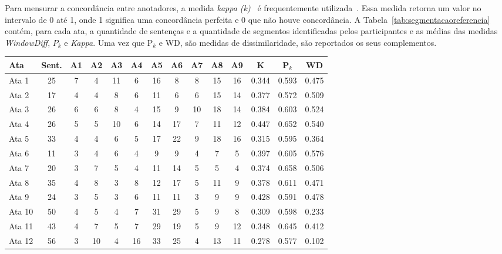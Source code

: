 Para mensurar a concordância entre anotadores, a medida \textit{kappa (k)}~\cite{Carletta1996} é frequentemente utilizada~\cite{Gruenstein2007, Cardoso2017, Hearst1997}.  Essa medida retorna um valor no intervalo de 0 até 1, onde 1 significa uma concordância perfeita e 0 que não houve concordância. A Tabela~\ref{tab:segmentacaoreferencia} contém, para cada ata, a quantidade de sentenças e a quantidade de segmentos identificadas pelos participantes e as médias das medidas \textit{WindowDiff}, $P_k$ e \textit{Kappa}. Uma vez que P$_k$ e WD, são medidas de dissimilaridade, são reportados os seus complementos.

\begin{table}[!h]
	\centering
	\begin{tabular}{|l|c|c|c|c|c|c|c|c|c|c|c|c|c|} \hline
		\textbf{Ata} & \textbf{Sent.}  & 
		\textbf{A1}  & 
		\textbf{A2}  & 
		\textbf{A3}  & 
		\textbf{A4}  & 
		\textbf{A5}  & 
		\textbf{A6}  & 
		\textbf{A7}  & 
		\textbf{A8}  & 
		\textbf{A9}  &
		\textbf{K}  &
		\textbf{P$_k$}  &
		\textbf{WD}  \\	\hline

		Ata 1  & 25 & 7  & 4  & 11 & 6  & 16 & 8  & 8  & 15 & 16 &  0.344 & 0.593 & 0.475 \\ \hline 
		Ata 2  & 17 & 4  & 4  & 8  & 6  & 11 & 6  & 6  & 15 & 14 &  0.377 & 0.572 & 0.509 \\ \hline 
		Ata 3  & 26 & 6  & 6  & 8  & 4  & 15 & 9  & 10 & 18 & 14 &  0.384 & 0.603 & 0.524 \\ \hline 
		Ata 4  & 26 & 5  & 5  & 10 & 6  & 14 & 17 & 7  & 11 & 12 &  0.447 & 0.652 & 0.540 \\ \hline 
		Ata 5  & 33 & 4  & 4  & 6  & 5  & 17 & 22 & 9  & 18 & 16 &  0.315 & 0.595 & 0.364 \\ \hline 
		Ata 6  & 11 & 3  & 4  & 6  & 4  & 9  & 9  & 4  & 7  &  5 &  0.397 & 0.605 & 0.576 \\ \hline 
		Ata 7  & 20 & 3  & 7  & 5  & 4  & 11 & 14 & 5  & 5  &  4 &  0.374 & 0.658 & 0.506 \\ \hline 
		Ata 8  & 35 & 4  & 8  & 3  & 8  & 12 & 17 & 5  & 11 &  9 &  0.378 & 0.611 & 0.471 \\ \hline 
		Ata 9  & 24 & 3  & 5  & 3  & 6  & 11 & 11 & 3  & 9  &  9 &  0.428 & 0.591 & 0.478 \\ \hline 
		Ata 10 & 50 & 4  & 5  & 4  & 7  & 31 & 29 & 5  & 9  &  8 &  0.309 & 0.598 & 0.233 \\ \hline 
		Ata 11 & 43 & 4  & 7  & 5  & 7  & 29 & 19 & 5  & 9  & 12 &  0.348 & 0.645 & 0.412 \\ \hline 
		Ata 12 & 56 & 3  & 10 & 4  & 16 & 33 & 25 & 4  & 13 & 11 &  0.278 & 0.577 & 0.102 \\ \hline 


\end{tabular}
\end{table}

